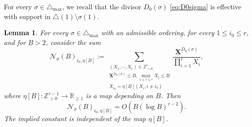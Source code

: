 \documentclass[11pt,letterpaper]{amsart}
\newcommand{\BR}{{\mathbb {R}}}
\newcommand{\BZ}{{\mathbb {Z}}}
\newcommand{\CN}{{\mathcal {N}}}
\newcommand{\XX}{\underline{\mathbf{X}}}
\theoremstyle{plain}
\numberwithin{equation}{section}
\newtheorem{lemma}[theorem]{Lemma}
\theoremstyle{definition}
\theoremstyle{remark}
\begin{document}
For every $\sigma\in\triangle_{\max}$, we recall that the divisor $D_0(\sigma)$ \eqref{eq:D0sigma} is effective with support in $\triangle(1)\setminus\sigma(1)$.
\begin{lemma}\label{co:slicing} 
	For every $\sigma\in\triangle_{\max}$ with an admissible ordering,  for every $1\leqslant i_0\leqslant r$, and for $B>2$,  consider the sum $$\CN_\sigma(B)_{i_0,\eta[B]}:=\sum_{\substack{(X_1,\cdots,X_r)\in\BZ_{>0}^{r}\\ \XX^{D_0(\sigma)}\leqslant B,\max_{1\leqslant i\leqslant r} X_i\leqslant B\\ X_{i_0}=\eta[B](X_i,i\neq i_0)}}\frac{\XX^{D_0(\sigma)}}{\prod_{i=1}^{r} X_i},$$ where $\eta[B]:\BZ_{>0}^{r-1}\to\BR_{\geqslant 1}$ is a map depending on $B$.
	Then $$\CN_\sigma(B)_{i_0,\eta[B]}=O(B(\log B)^{r-2}).$$
	The implied constant is independent of the map $\eta[B]$.
\end{lemma}
\end{document}
